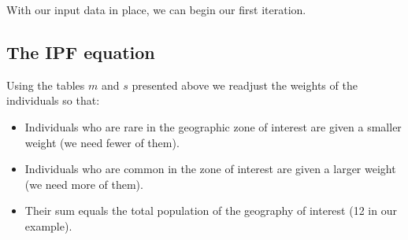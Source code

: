 \documentclass[a4paper, 11pt, twoside]{article}
\begin{document}
With our input data in place, we can begin our first iteration.

\subsection{The IPF equation} \label{ipfeq}


Using the tables $m$ and $s$ presented above we readjust the weights of the
individuals so that:

\begin{itemize}
  \item Individuals who are rare in the geographic zone of interest are given a smaller weight (we need fewer of them).
  \item Individuals who are common in the zone of interest are given a larger weight (we need more of them).
  \item Their sum equals the total population of the geography of interest (12 in our example).
\end{itemize}
\end{document}
